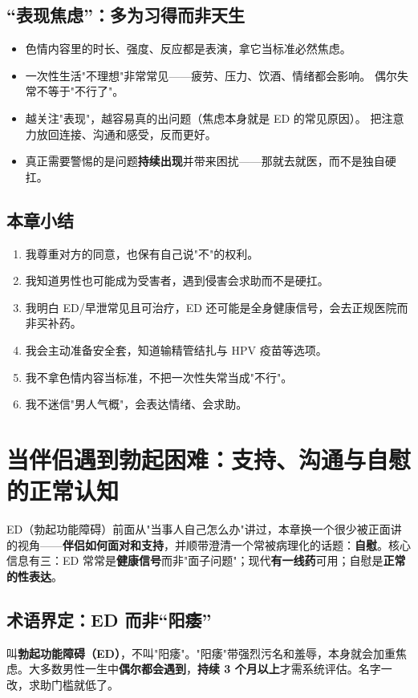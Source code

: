 \documentclass[12pt,UTF8,openany]{ctexbook}
\begin{document}
\section{“表现焦虑”：多为习得而非天生}

\begin{itemize}[leftmargin=2em]
  \item 色情内容里的时长、强度、反应都是表演，拿它当标准必然焦虑。
  \item 一次性生活"不理想"非常常见——疲劳、压力、饮酒、情绪都会影响。
        偶尔失常不等于"不行了"。
  \item 越关注"表现"，越容易真的出问题（焦虑本身就是 ED 的常见原因）。
        把注意力放回连接、沟通和感受，反而更好。
  \item 真正需要警惕的是问题\textbf{持续出现}并带来困扰——那就去就医，而不是独自硬扛。
\end{itemize}

\section{本章小结}

\begin{enumerate}[leftmargin=2em,itemsep=0.3em]
  \item 我尊重对方的同意，也保有自己说"不"的权利。
  \item 我知道男性也可能成为受害者，遇到侵害会求助而不是硬扛。
  \item 我明白 ED/早泄常见且可治疗，ED 还可能是全身健康信号，会去正规医院而非买补药。
  \item 我会主动准备安全套，知道输精管结扎与 HPV 疫苗等选项。
  \item 我不拿色情内容当标准，不把一次性失常当成"不行"。
  \item 我不迷信"男人气概"，会表达情绪、会求助。
\end{enumerate}

\chapter{当伴侣遇到勃起困难：支持、沟通与自慰的正常认知}
\label{chap:partner-ed}

ED（勃起功能障碍）前面从"当事人自己怎么办"讲过，本章换一个很少被正面讲的视角——\textbf{伴侣如何面对和支持}，并顺带澄清一个常被病理化的话题：\textbf{自慰}。核心信息有三：ED 常常是\textbf{健康信号}而非"面子问题"；现代\textbf{有一线药}可用；自慰是\textbf{正常的性表达}。

\section{术语界定：ED 而非“阳痿”}
叫\textbf{勃起功能障碍（ED）}，不叫"阳痿"。"阳痿"带强烈污名和羞辱，本身就会加重焦虑。大多数男性一生中\textbf{偶尔都会遇到}，\textbf{持续 3 个月以上}才需系统评估。名字一改，求助门槛就低了。
\end{document}
